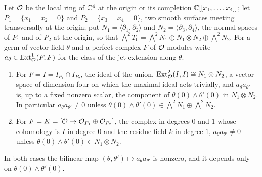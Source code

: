 \begin{lemma}\label{lem:localproducts}
Let $\mathcal{O}$ be the local ring of $\mathbb{C}^{4}$ at the origin or its completion
$\mathbb{C}[[x_{1},\dots,x_{4}]]$; let $P_{1}=\{x_{1}=x_{2}=0\}$ and
$P_{2}=\{x_{3}=x_{4}=0\}$, two smooth surfaces meeting transversally at the
origin; put $N_{1}=\langle\partial_{1},\partial_{2}\rangle$ and
$N_{2}=\langle\partial_{3},\partial_{4}\rangle$, the normal spaces of $P_{1}$
and of $P_{2}$ at the origin, so that
$\bigwedge^{2}T_{0}=\bigwedge^{2}N_{1}\oplus N_{1}\otimes N_{2}\oplus\bigwedge^{2}N_{2}$.
For a germ of vector field $\theta$ and a perfect complex $F$ of
$\mathcal{O}$-modules write $a_{\theta}\in\operatorname{Ext}^{1}_{\mathcal{O}}(F,F)$ for the class of the
jet extension along $\theta$.
\begin{enumerate}[label=\textup{(\roman*)},nosep]
\item For $F=I=I_{P_{1}}\cap I_{P_{2}}$, the ideal of the union,
  $\operatorname{Ext}^{2}_{\mathcal{O}}(I,I)\cong N_{1}\otimes N_{2}$, a vector space of dimension
  four on which the maximal ideal acts trivially, and
  $a_{\theta}a_{\theta'}$ is, up to a fixed nonzero scalar, the component of
  $\theta(0)\wedge\theta'(0)$ in $N_{1}\otimes N_{2}$. In particular
  $a_{\theta}a_{\theta'}\ne0$ unless $\theta(0)\wedge\theta'(0)\in
  \bigwedge^{2}N_{1}\oplus\bigwedge^{2}N_{2}$.
\item For $F=K=[\mathcal{O}\to\mathcal{O}_{P_{1}}\oplus\mathcal{O}_{P_{2}}]$, the complex in degrees
  $0$ and $1$ whose cohomology is $I$ in degree $0$ and the residue field $k$
  in degree $1$, $a_{\theta}a_{\theta'}\ne0$ unless
  $\theta(0)\wedge\theta'(0)\in N_{1}\otimes N_{2}$.
\end{enumerate}
In both cases the bilinear map $(\theta,\theta')\mapsto a_{\theta}a_{\theta'}$
is nonzero, and it depends only on $\theta(0)\wedge\theta'(0)$.
\end{lemma}

